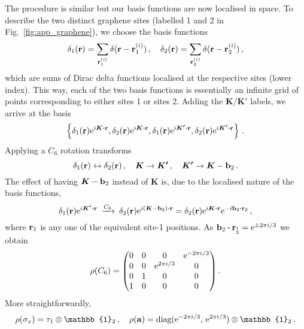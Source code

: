The procedure is similar but our basis functions are now localised in space. To describe the two distinct graphene sites (labelled 1 and 2 in Fig.~\ref{fig:app_graphene}), we choose the basis functions
\begin{equation}
\delta_1(\vb{r}) = \sum_{\vb{r}^{(i)}_1} \delta(\vb{r} - \vb{r}^{(i)}_1) \,, \quad \delta_2(\vb{r}) = \sum_{\vb{r}^{(i)}_2} \delta(\vb{r} - \vb{r}^{(i)}_2) \,,
\end{equation}
which are sums of Dirac delta functions localised at the respective sites (lower index). This way, each of the two basis functions is essentially an infinite grid of points corresponding to either sites 1 or sites 2. Adding the $\boldsymbol{K} / \boldsymbol{K'}$ labels, we arrive at the basis
\begin{equation}
\left\{ \delta_1(\vb{r}) \e^{i \boldsymbol{K} \vdot \vb{r}}, \delta_2(\vb{r}) \e^{i \boldsymbol{K} \vdot \vb{r}}, \delta_1(\vb{r}) \e^{i \boldsymbol{K'} \vdot \vb{r}}, \delta_2(\vb{r}) \e^{i \boldsymbol{K'} \vdot \vb{r}} \right\} \,.
\end{equation}
%
Applying a $C_6$ rotation transforms
\begin{equation}
 \delta_1(\vb{r}) \leftrightarrow \delta_2(\vb{r}) \,, \quad \boldsymbol{K} \rightarrow \boldsymbol{K'} \,, \quad \boldsymbol{K'} \rightarrow \boldsymbol{K} - \vb{b}_2 \,.
\end{equation}
%
The effect of having $\boldsymbol{K} - \vb{b}_2$ instead of $\boldsymbol{K}$ is, due to the localised nature of the basis functions,
\begin{equation}
\delta_1(\vb{r}) \e^{i \boldsymbol{K'} \vdot \vb{r}} \: \xrightarrow[]{C_6} \:  \delta_2(\vb{r}) \e^{i \left(\boldsymbol{K} - \vb{b}_2 \right) \vdot \vb{r}} = \delta_2(\vb{r}) \e^{i \boldsymbol{K} \vdot \vb{r}} \e^{-i \vb{b}_2 \vdot \vb{r}_2} \,,
\end{equation}
where $\vb{r}_1$ is any one of the equivalent site-1 positions. As $\vb{b}_2 \vdot \vb{r}_{_{2}^{1}} = \e^{\pm 2 \pi i / 3}$ we obtain 
\begin{equation}
\rho(C_6) = \mqty( 0 & 0 & 0 & \e^{-2 \pi i / 3} \\ 0 & 0 & \e^{2 \pi i / 3} & 0 \\ 0 & 1 & 0 & 0 \\ 1 & 0 & 0 & 0) \,.
\end{equation}
%
More straightforwardly,
\begin{equation}
\rho(\sigma_x) = \tau_1 \otimes \mathbb{1}_2 \,, \quad \rho(\vb{a}) = \text{diag}(  \e^{-2 \pi i /3} , \, \e^{2 \pi i /3} ) \otimes \mathbb{1}_2 \,.
\end{equation}
